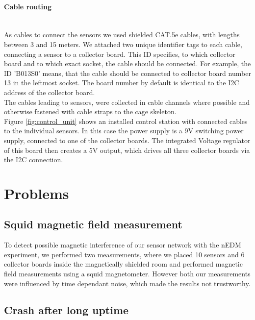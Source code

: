 \documentclass[a4paper]{scrreprt}
\begin{document}
\paragraph{Cable routing}\hspace{1cm}\\
As cables to connect the sensors we used shielded CAT.5e cables, with lengths between 3 and 15 meters.
We attached two unique identifier tags to each cable, connecting a sensor to a collector
board. This ID specifies, to which collector board and to which exact socket,
the cable should be connected. For example, the ID 'B013S0' means, that the cable should
be connected to collector board number 13 in the leftmost socket. The board number by default is identical to the I2C address of the collector board.\\
The cables leading to sensors, were collected in cable channels where possible and otherwise
fastened with cable straps to the cage skeleton.\\
Figure \ref{fig:control_unit} shows an installed control station with connected cables to
the individual sensors. In this case the power supply is a 9V switching power supply, connected
to one of the collector boards. The integrated Voltage regulator of this board then creates
a 5V output, which drives all three collector boards via the I2C connection.
\section{Problems}
\subsection{Squid magnetic field measurement}
To detect possible magnetic interference of our sensor network with the nEDM experiment,
we performed two measurements, where
we placed 10 sensors and 6 collector boards inside the magnetically shielded room and performed
magnetic field measurements using a squid magnetometer. However both our measurements were
influenced by time dependant noise, which made the results not trustworthy.
\subsection{Crash after long uptime}
\end{document}

